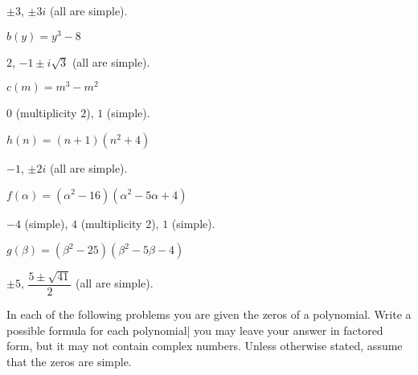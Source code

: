 \begin{exercises}
\begin{problem}[Zeros]
\begin{multicols}{3}
\begin{subproblem}
\begin{shortsolution}
        $\pm 3$, $\pm 3i$ (all are simple).
        \end{shortsolution}
    \end{subproblem}
    \begin{subproblem}
        $b(y)=y^3-8$ 
        \begin{shortsolution}
         $2$, $-1\pm i\sqrt{3}$ (all are simple).
        \end{shortsolution}
    \end{subproblem}
    \begin{subproblem}
        $c(m)=m^3-m^2$
        \begin{shortsolution}
            $0$ (multiplicity $2$), $1$ (simple).
        \end{shortsolution}
    \end{subproblem}
    \begin{subproblem}
        $h(n)=(n+1)(n^2+4)$ 
        \begin{shortsolution}
            $-1$, $\pm 2i$ (all are simple).
        \end{shortsolution}
    \end{subproblem}
    \begin{subproblem}
        $f(\alpha)=(\alpha^2-16)(\alpha^2-5\alpha+4)$ 
        \begin{shortsolution}
            $-4$ (simple), $4$ (multiplicity $2$), $1$ (simple).
        \end{shortsolution}
    \end{subproblem}
    \begin{subproblem}
        $g(\beta)=(\beta^2-25)(\beta^2-5\beta-4)$ 
        \begin{shortsolution}
         $\pm 5$, $\dfrac{5\pm\sqrt{41}}{2}$ (all are simple).
        \end{shortsolution}
    \end{subproblem}
\end{multicols}
\end{problem}
\begin{problem}
In each of the following problems you are given the zeros of a polynomial. 
Write a possible formula for each polynomial| you may leave your 
answer in factored form, but it may not contain complex numbers. Unless
otherwise stated, assume that the zeros are simple.
\begin{multicols}{3}
    \begin{subproblem}

\end{subproblem}
\end{multicols}
\end{problem}
\end{exercises}
